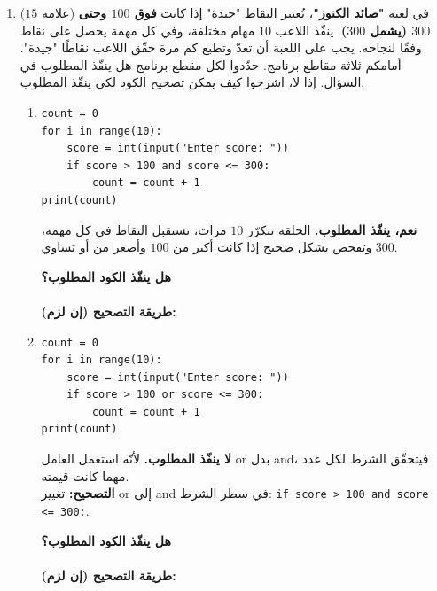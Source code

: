 \documentclass[14pt]{extarticle}
\begin{document}
\begin{enumerate}[label=\textbf{السؤال \arabic*:}, wide=0pt, itemsep=2.2em]
\item ($15$ علامة) في لعبة \textbf{"صائد الكنوز"}، تُعتبر النقاط "جيدة" إذا كانت \textbf{فوق $100$ وحتى $300$ (يشمل $300$)}.
ينفّذ اللاعب $10$ مهام مختلفة، وفي كل مهمة يحصل على نقاط وفقًا لنجاحه.
يجب على اللعبة أن تعدّ وتطبع كم مرة حقّق اللاعب نقاطًا "جيدة".
أمامكم ثلاثة مقاطع برنامج. حدّدوا لكل مقطع برنامج هل ينفّذ المطلوب في السؤال. إذا لا، اشرحوا كيف يمكن تصحيح الكود لكي ينفّذ المطلوب.

\begin{enumerate}[label=\textbf{مقطع \alph*:}, wide=0pt, itemsep=1.5em]

\item \mbox{}
\begin{boxCode}
\begin{english}
\begin{verbatim}
count = 0
for i in range(10):
    score = int(input("Enter score: "))
    if score > 100 and score <= 300:
        count = count + 1
print(count)
\end{verbatim}
\end{english}
\end{boxCode}
\ifwithsols
\begin{boxSolution}
\textbf{نعم، ينفّذ المطلوب.} الحلقة تتكرّر $10$ مرات، تستقبل النقاط في كل مهمة، وتفحص بشكل صحيح إذا كانت أكبر من $100$ وأصغر من أو تساوي $300$.
\end{boxSolution}
\else
\vspace{0.5cm}
\textbf{هل ينفّذ الكود المطلوب؟} \hrulefill \\
 \\
\textbf{طريقة التصحيح (إن لزم):} \hrulefill
\fi
\filbreak

\item \mbox{}
\begin{boxCode}
\begin{english}
\begin{verbatim}
count = 0
for i in range(10):
    score = int(input("Enter score: "))
    if score > 100 or score <= 300:
        count = count + 1
print(count)
\end{verbatim}
\end{english}
\end{boxCode}
\ifwithsols
\begin{boxSolution}
\textbf{لا ينفّذ المطلوب.} لأنّه استعمل العامل \textenglish{or} بدل \textenglish{and}، فيتحقّق الشرط لكل عدد مهما كانت قيمته. \\
\textbf{التصحيح:} تغيير \textenglish{or} إلى \textenglish{and} في سطر الشرط: \textenglish{\texttt{if score > 100 and score <= 300:}}.
\end{boxSolution}
\else
\vspace{0.5cm}
\textbf{هل ينفّذ الكود المطلوب؟} \hrulefill \\
 \\
\textbf{طريقة التصحيح (إن لزم):} \hrulefill
\fi
\filbreak


\end{enumerate}
\end{enumerate}
\end{document}
